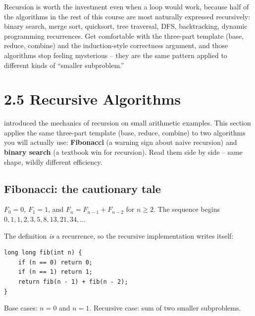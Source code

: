 \documentclass[11pt]{article}
\begin{document}
\begin{ideabox}
Recursion is worth the investment even when a loop would work,
because half of the algorithms in the rest of this course are most
naturally expressed recursively: binary search, merge sort, quicksort,
tree traversal, DFS, backtracking, dynamic programming recurrences.
Get comfortable with the three-part template (base, reduce, combine)
and the induction-style correctness argument, and those algorithms
stop feeling mysterious -- they are the same pattern applied to
different kinds of ``smaller subproblem.''
\end{ideabox}

\section{2.5 Recursive Algorithms}

 introduced the mechanics of recursion on small
arithmetic examples. This section applies the same three-part template
(base, reduce, combine) to two algorithms you will actually use:
\textbf{Fibonacci} (a warning sign about naive recursion) and
\textbf{binary search} (a textbook win for recursion). Read them side
by side -- same shape, wildly different efficiency.

\subsection{Fibonacci: the cautionary tale}

\begin{defnbox}
$F_0 = 0$, $F_1 = 1$, and $F_n = F_{n-1} + F_{n-2}$ for $n \ge 2$. The
sequence begins $0, 1, 1, 2, 3, 5, 8, 13, 21, 34, \ldots$
\end{defnbox}

The definition \emph{is} a recurrence, so the recursive implementation
writes itself:

\begin{examplebox}
\begin{verbatim}
long long fib(int n) {
    if (n == 0) return 0;
    if (n == 1) return 1;
    return fib(n - 1) + fib(n - 2);
}
\end{verbatim}
Base cases: $n = 0$ and $n = 1$. Recursive case: sum of two smaller
subproblems.
\end{examplebox}
\end{document}
